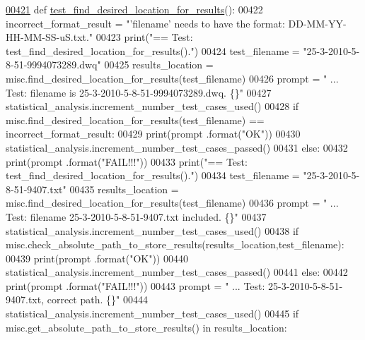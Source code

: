 \begin{DoxyCode}
\hypertarget{classutilities_1_1miscellaneous__tester_1_1misc__tester_l00421}{}\hyperlink{classutilities_1_1miscellaneous__tester_1_1misc__tester_afc179d9fd7be9c37989dd86340bb40f7}{00421}     \textcolor{keyword}{def }\hyperlink{classutilities_1_1miscellaneous__tester_1_1misc__tester_afc179d9fd7be9c37989dd86340bb40f7}{test\_find\_desired\_location\_for\_results}():
00422         incorrect\_format\_result = \textcolor{stringliteral}{"'filename' needs to have the format: DD-MM-YY-HH-MM-SS-uS.txt."}
00423         print(\textcolor{stringliteral}{"==   Test: test\_find\_desired\_location\_for\_results()."})
00424         test\_filename = \textcolor{stringliteral}{"25-3-2010-5-8-51-9994073289.dwq"}
00425         results\_location = misc.find\_desired\_location\_for\_results(test\_filename)
00426         prompt = \textcolor{stringliteral}{"  ... Test: filename is 25-3-2010-5-8-51-9994073289.dwq.  \{\}"}
00427         statistical\_analysis.increment\_number\_test\_cases\_used()
00428         \textcolor{keywordflow}{if} misc.find\_desired\_location\_for\_results(test\_filename) == incorrect\_format\_result:
00429             print(prompt .format(\textcolor{stringliteral}{"OK"}))
00430             statistical\_analysis.increment\_number\_test\_cases\_passed()
00431         \textcolor{keywordflow}{else}:
00432             print(prompt .format(\textcolor{stringliteral}{"FAIL!!!"}))
00433         print(\textcolor{stringliteral}{"==   Test: test\_find\_desired\_location\_for\_results()."})
00434         test\_filename = \textcolor{stringliteral}{"25-3-2010-5-8-51-9407.txt"}
00435         results\_location = misc.find\_desired\_location\_for\_results(test\_filename)
00436         prompt = \textcolor{stringliteral}{"  ... Test: filename 25-3-2010-5-8-51-9407.txt included.  \{\}"}
00437         statistical\_analysis.increment\_number\_test\_cases\_used()
00438         \textcolor{keywordflow}{if} misc.check\_absolute\_path\_to\_store\_results(results\_location,test\_filename):
00439             print(prompt .format(\textcolor{stringliteral}{"OK"}))
00440             statistical\_analysis.increment\_number\_test\_cases\_passed()
00441         \textcolor{keywordflow}{else}:
00442             print(prompt .format(\textcolor{stringliteral}{"FAIL!!!"}))
00443         prompt = \textcolor{stringliteral}{"  ... Test: 25-3-2010-5-8-51-9407.txt, correct path.  \{\}"}
00444         statistical\_analysis.increment\_number\_test\_cases\_used()
00445         \textcolor{keywordflow}{if} misc.get\_absolute\_path\_to\_store\_results() \textcolor{keywordflow}{in} results\_location:

\end{DoxyCode}

